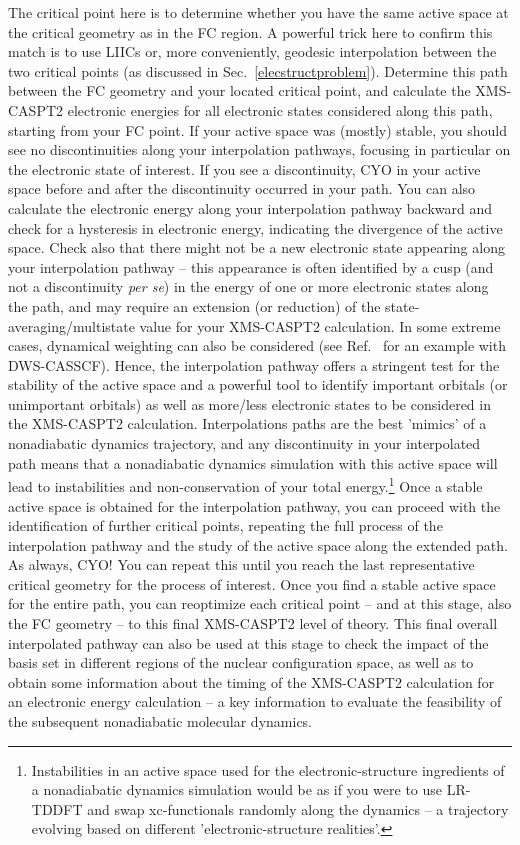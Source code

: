 \documentclass[9pt,bestpractices]{livecoms}
\begin{document}
The critical point here is to determine whether you have the same active space at the critical geometry as in the FC region. A powerful trick here to confirm this match is to use LIICs or, more conveniently, geodesic interpolation between the two critical points (as discussed in Sec.~\ref{elecstructproblem}). Determine this path between the FC geometry and your located critical point, and calculate the XMS-CASPT2 electronic energies for all electronic states considered along this path, starting from your FC point. If your active space was (mostly) stable, you should see no discontinuities along your interpolation pathways, focusing in particular on the electronic state of interest. If you see a discontinuity, CYO in your active space before and after the discontinuity occurred in your path. You can also calculate the electronic energy along your interpolation pathway backward and check for a hysteresis in electronic energy, indicating the divergence of the active space. Check also that there might not be a new electronic state appearing along your interpolation pathway -- this appearance is often identified by a cusp (and not a discontinuity \textit{per se}) in the energy of one or more electronic states along the path, and may require an extension (or reduction) of the state-averaging/multistate value for your XMS-CASPT2 calculation. In some extreme cases, dynamical weighting can also be considered (see Ref.~ for an example with DWS-CASSCF). Hence, the interpolation pathway offers a stringent test for the stability of the active space and a powerful tool to identify important orbitals (or unimportant orbitals) as well as more/less electronic states to be considered in the XMS-CASPT2 calculation. Interpolations paths are the best 'mimics' of a nonadiabatic dynamics trajectory, and any discontinuity in your interpolated path means that a nonadiabatic dynamics simulation with this active space will lead to instabilities and non-conservation of your total energy.\footnote{Instabilities in an active space used for the electronic-structure ingredients of a nonadiabatic dynamics simulation would be as if you were to use LR-TDDFT and swap xc-functionals randomly along the dynamics -- a trajectory evolving based on different 'electronic-structure realities'.} Once a stable active space is obtained for the interpolation pathway, you can proceed with the identification of further critical points, repeating the full process of the interpolation pathway and the study of the active space along the extended path. As always, CYO! You can repeat this until you reach the last representative critical geometry for the process of interest. Once you find a stable active space for the entire path, you can reoptimize each critical point -- and at this stage, also the FC geometry -- to this final XMS-CASPT2 level of theory. This final overall interpolated pathway can also be used at this stage to check the impact of the basis set in different regions of the nuclear configuration space, as well as to obtain some information about the timing of the XMS-CASPT2 calculation for an electronic energy calculation -- a key information to evaluate the feasibility of the subsequent nonadiabatic molecular dynamics. 
\end{document}
